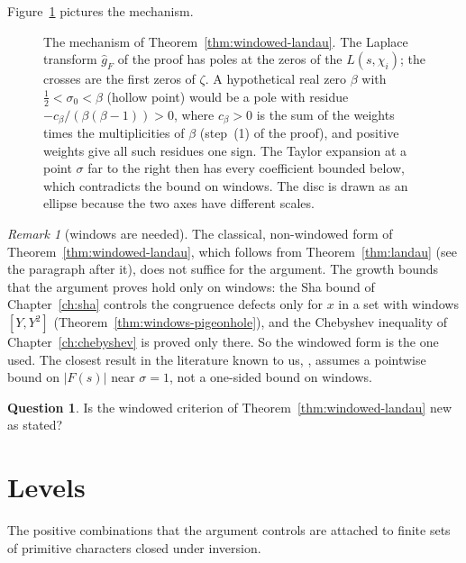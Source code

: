 \documentclass[11pt]{amsbook}
\theoremstyle{plain}
\theoremstyle{definition}
\newtheorem{question}[theorem]{Question}
\theoremstyle{remark}
\newtheorem{remark}[theorem]{Remark}
\numberwithin{equation}{section}
\numberwithin{figure}{chapter}
\numberwithin{table}{chapter}
\begin{document}
Figure~\ref{fig:landau} pictures the mechanism.

\begin{figure}[htbp]
\centering

\caption{The mechanism of Theorem~\ref{thm:windowed-landau}. The Laplace
transform $\widehat g_F$ of the proof has poles at the zeros of the
$L(s,\chi_i)$; the crosses are the first zeros of $\zeta$. A
hypothetical real zero $\beta$ with $\frac12<\sigma_0<\beta$ (hollow
point) would be a pole with residue $-c_\beta/(\beta(\beta-1))>0$,
where $c_\beta>0$ is the sum of the weights times the multiplicities
of $\beta$ (step~(1) of the proof), and positive weights
give all such residues one sign.
The Taylor expansion at a point $\sigma$ far to the right then
has every coefficient bounded below, which contradicts the bound on
windows. The disc is drawn as an ellipse because the two axes have
different scales.}
\label{fig:landau}
\end{figure}

\begin{remark}[windows are needed]\label{rem:landau-compare}
The classical, non-windowed form of
Theorem~\ref{thm:windowed-landau}, which follows from
Theorem~\ref{thm:landau} (see the paragraph after it), does not
suffice for the argument. The growth bounds that the argument proves
hold only on windows: the Sha
bound of Chapter~\ref{ch:sha} controls the congruence defects only
for $x$ in a set with windows $[Y,Y^2]$
(Theorem~\ref{thm:windows-pigeonhole}), and the Chebyshev inequality
of Chapter~\ref{ch:chebyshev} is proved only there. So the windowed
form is the one used. The closest result in the literature known to
us, \cite[Thm.~3.1]{BrouckeRevesz2026landau}, assumes a pointwise
bound on $|F(s)|$ near $\sigma=1$, not a one-sided bound on windows.
\end{remark}

\begin{question}\label{q:landau-new}
Is the windowed criterion of Theorem~\ref{thm:windowed-landau} new as
stated?
\end{question}

\section{Levels}

The positive combinations that the argument controls are attached to
finite sets of primitive characters closed under inversion.
\end{document}
